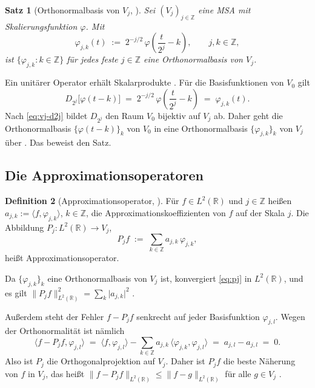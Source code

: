 \documentclass[a4paper,11pt,bibliography=totoc,listof=totoc,headinclude=true,cleardoublepage=empty,oneside]{scrbook}
\theoremstyle{plain}
\newtheorem{Satz}{Satz}[chapter]
\theoremstyle{definition}
\newtheorem{Definition}[Satz]{Definition}
\newcommand{\R}{\mathbb{R}}
\newcommand{\Z}{\mathbb{Z}}
\newcommand{\LZwei}{L^2(\R)}
\newcommand{\scal}[2]{\langle #1, #2 \rangle}
\newcommand{\norm}[1]{\lVert #1 \rVert}
\begin{document}
\begin{Satz}[Orthonormalbasis von $V_j$, {\cite[Kap.~5.1]{blatter}}] %
\label{satz:onb-vj}
Sei $(V_j)_{j\in\Z}$ eine MSA mit Skalierungsfunktion $\varphi$. Mit
\begin{equation}
\label{eq:phi-jk}
  \varphi_{j,k}(t) \;:=\; 2^{-j/2}\,\varphi\!\left(\frac{t}{2^{j}} - k\right),
  \qquad j,k \in \Z ,
\end{equation}
ist $\{\varphi_{j,k} : k \in \Z\}$ für jedes feste $j \in \Z$ eine
Orthonormalbasis von $V_j$.
\end{Satz}

Ein unitärer Operator erhält Skalarprodukte \cite[Übung~27.2]{serov}. %
Für die Basisfunktionen von $V_0$ gilt
\[
  D_{2^j}\bigl[\varphi(t - k)\bigr]
  \;=\; 2^{-j/2}\,\varphi\!\left(\frac{t}{2^j} - k\right)
  \;=\; \varphi_{j,k}(t) .
\]
Nach \eqref{eq:vj-d2j} bildet $D_{2^j}$ den Raum $V_0$ bijektiv auf $V_j$ ab.
Daher geht die Orthonormalbasis $\{\varphi(t-k)\}_k$ von $V_0$ in eine
Orthonormalbasis $\{\varphi_{j,k}\}_k$ von $V_j$ über
\cite[Def.~27.7, Satz~25.18]{serov}. %
Das beweist den Satz.

\subsection{Die Approximationsoperatoren}
\label{subsec:approximationsoperatoren}

\begin{Definition}[Approximationsoperator, {\cite[Bem.~2.2.2\,(a)]{lmr}}] %
\label{def:projektion-pj}
Für $f \in \LZwei$ und $j \in \Z$ hei\ss{}en
$a_{j,k} := \scal{f}{\varphi_{j,k}}$, $k \in \Z$, die
Approximationskoeffizienten von $f$ auf der Skala $j$. Die Abbildung
$P_j \colon \LZwei \to V_j$,
\begin{equation}
\label{eq:pj}
  P_j f \;:=\; \sum_{k\in\Z} a_{j,k}\,\varphi_{j,k},
\end{equation}
hei\ss{}t Approximationsoperator.
\end{Definition}

Da $\{\varphi_{j,k}\}_k$ eine Orthonormalbasis von $V_j$ ist, konvergiert
\eqref{eq:pj} in $\LZwei$, und es gilt
$\norm{P_j f}_{\LZwei}^2 = \sum_{k} \lvert a_{j,k}\rvert^2$
\cite[Satz~25.18]{serov}. %

Au\ss{}erdem steht der Fehler $f - P_j f$ senkrecht auf jeder Basisfunktion
$\varphi_{j,l}$. Wegen der Orthonormalität ist nämlich
\[
  \scal{f - P_j f}{\varphi_{j,l}}
  \;=\; \scal{f}{\varphi_{j,l}} - \sum_{k\in\Z} a_{j,k}\,\scal{\varphi_{j,k}}{\varphi_{j,l}}
  \;=\; a_{j,l} - a_{j,l} \;=\; 0 .
\]
Also ist $P_j$ die Orthogonalprojektion auf $V_j$. Daher ist $P_j f$ die beste
Näherung von $f$ in $V_j$, das hei\ss{}t
$\norm{f - P_j f}_{\LZwei} \le \norm{f - g}_{\LZwei}$ für alle $g \in V_j$
\cite[Satz~31.6]{hankebourgeois}. %
\end{document}
